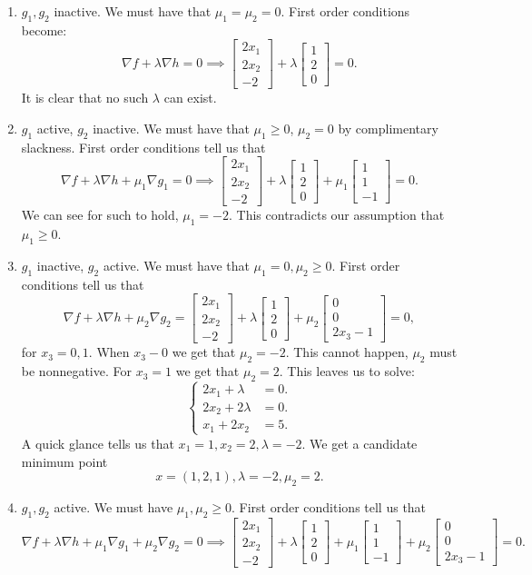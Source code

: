 \documentclass[12pt, a4paper]{article}
\theoremstyle{definition}
\newcommand{\grad}{\nabla}
\newcommand{\bmat}[1]{\begin{bmatrix}#1\end{bmatrix}}
\begin{document}
\begin{enumerate}[label =  \textbf{Case \Roman*:}] 
	\item $g_1,g_2$ inactive. We must have that $\mu_1 =\mu_2 = 0$. First order conditions become: 
	$$\grad f + \lambda \grad h = 0 \implies \bmat{2x_1 \\ 2x_2 \\ -2} + \lambda \bmat{1 \\ 2 \\ 0} = 0.$$
	It is clear that no such $\lambda$ can exist.   
	\item $g_1$ active, $g_2$ inactive. We must have that $\mu_1 \geq 0$, $\mu_2 = 0$ by complimentary slackness. First order conditions tell us that
	$$\grad f + \lambda \grad h + \mu_1 \grad g_1 =0 \implies \bmat{2x_1 \\ 2x_2 \\ -2} + \lambda \bmat{1 \\ 2 \\ 0} + \mu_1 \bmat{1 \\ 1 \\ -1} = 0.$$
	We can see for such to hold, $\mu_1 = -2$. This contradicts our assumption that $\mu_1 \geq 0$. 
	\item $g_1$ inactive, $g_2$ active. We must have that $\mu_1 = 0, \mu_2\geq 0$. First order conditions tell us that 
	$$\grad f + \lambda \grad h + \mu_2 \grad g_2 = \bmat{2x_1 \\ 2x_2 \\ -2} + \lambda \bmat{1 \\ 2 \\ 0} + \mu_2 \bmat{0\\ 0 \\ 2x_3 - 1} = 0,$$
	for $x_3 = 0,1$. When $x_3 -0$ we get that $\mu_2 = -2$. This cannot happen, $\mu_2$ must be nonnegative. For $x_3 = 1$ we get that $\mu_2 = 2$. This leaves us to solve:
	$$\begin{cases}
		2x_1 + \lambda & = 0.
		\\ 2x_2 + 2\lambda & = 0. 
		\\ x_1+2x_2 & = 5.
	\end{cases}$$
A quick glance tells us that $x_1 = 1,x_2 = 2, \lambda = -2$. We get a candidate minimum point $$x =(1,2,1), \lambda = -2,\mu_2 = 2. $$  
\item $g_1,g_2$ active. We must have $\mu_1,\mu_2 \geq 0$. First order conditions tell us that
$$\grad f + \lambda \grad h + \mu_1 \grad g_1 + \mu_2 \grad g_2 = 0  \implies \bmat{2x_1 \\ 2x_2 \\ -2} + \lambda \bmat{1 \\ 2 \\ 0} + \mu_1 \bmat{1 \\ 1 \\ -1} + \mu_2 \bmat{0 \\ 0 \\ 2x_3 -1}= 0 .$$

\end{enumerate}
\end{document}
